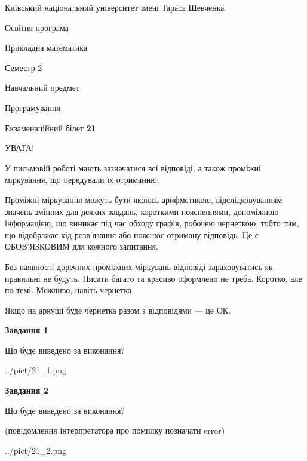 \documentclass[12pt, ukrainian]{article}
\begin{document}
{{\begin {small}\par
{ \center  Київський національний університет імені Тараса Шевченка \par}
{\parbox {5 cm}{Освітня програма \hfill}{\parbox {7 cm}{Прикладна математика\hfill}}\parbox {6 cm}{\hfill Семестр 2}}\par
{\parbox {5 cm} {Навчальний предмет \hfill}\parbox {7 cm}{Програмування \hfill}\parbox {6cm}{\hfill}\par}\vspace{-7pt} \end{small}}{\center Екзаменаційний білет \No \textbf
{ 21 }\par}}
{
\begin {large}
УВАГА!

У письмовій роботі мають зазначатися всі відповіді, а також проміжні міркування, що передували їх отриманню.

Проміжні міркування можуть бути якоюсь арифметикою, відслідковуванням зна\-чень змінних для деяких завдань,
короткими поясненнями, допоміжною інформацією, що виникає під час обходу графів, робочею чернеткою,
тобто тим, що відображає хід розв’язання або пояснює отриману відповідь.
Це є ОБОВ’ЯЗКОВИМ для кожного запитання.

Без наявності доречних проміжних міркувань відповіді зараховуватись як правиль\-ні не будуть.
Писати багато та красиво оформлено не треба. Коротко, але по темі. Можли\-во, навіть чернетка.

Якщо на аркуші буде чернетка разом з відповідями --- це ОК.

\newpage

{\begin {center}\textbf{Завдання 1}\end {center}}\par
Що буде виведено за виконання?\par
\begin{center}
	{../pict/21_1.png}
\end{center}
\newpage

{\begin {center}\textbf{Завдання 2}\end {center}}\par
Що буде виведено за виконання?\par
 (повідомлення інтерпретатора про помилку позначати error)\par
\begin{center}
	{../pict/21_2.png}
\end{center}
\newpage


\end{large}}
\end{document}
